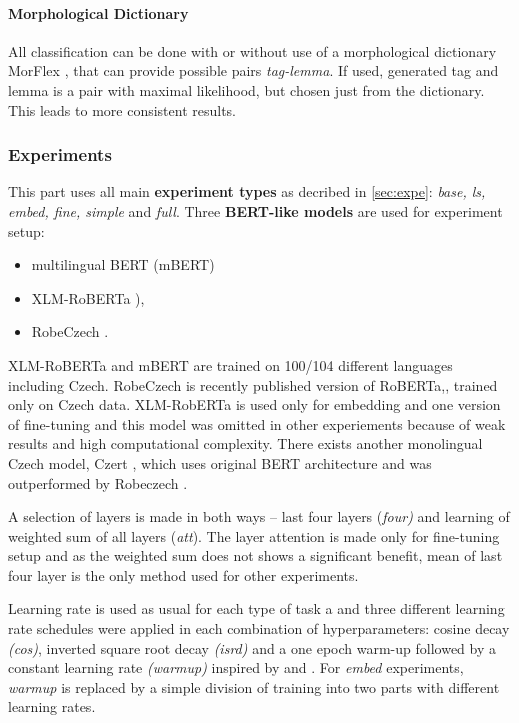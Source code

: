 

\paragraph{Morphological Dictionary} All classification can be done with or without use of a morphological dictionary MorFlex \citep{11234/1-1834}, that can provide possible pairs \textit{tag-lemma}. If used, generated tag and lemma is a pair with maximal likelihood, but chosen just from the dictionary. This leads to more consistent results. 



\subsubsection{Experiments}
This part uses all main \textbf{experiment types} as decribed in \ref{sec:expe}: \textit{base, ls, embed, fine, simple} and \textit{full}. Three \textbf{BERT-like models} are used for experiment setup:
\begin{itemize}
\item multilingual BERT (mBERT) \citep{Devlin2019} 
\item XLM-RoBERTa \citep{Conneau2019}), 
\item RobeCzech \citep{Straka2021}.
\end{itemize}
XLM-RoBERTa and mBERT are trained on 100/104 different languages including Czech. RobeCzech is recently published version of RoBERTa,, trained only on Czech data. XLM-RobERTa is used only for embedding and one version of fine-tuning and this model was omitted in other experiements because of weak results and high computational complexity. There exists another monolingual Czech model, Czert \citep{Sido2021}, which uses original BERT architecture and was outperformed by Robeczech \citep{Straka2021}. \par
A selection of layers is made in both ways -- last four layers (\textit{four)} and learning of weighted sum of all layers (\textit{att}). The layer attention is made only for fine-tuning setup and as the weighted sum does not shows a significant benefit, mean of last four layer is the only method used for other experiments.
 \par Learning rate is used as usual for each type of task a and three different learning rate schedules were applied in each combination of hyperparameters: cosine decay \textit{(cos)}, inverted square root decay \textit{(isrd)} and a one epoch warm-up followed by a constant learning rate \textit{(warmup)} inspired by \citep{Kondratyuk2019} and \citep{Ruder2018}. For \textit{embed} experiments, \textit{warmup} is replaced by  a simple division of training into two parts with different learning rates. 
 
